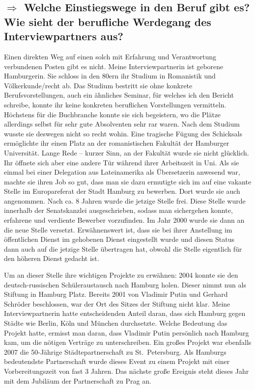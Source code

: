 \documentclass[12pt,headsepline,a4paper]{scrartcl}
\newcommand\quest[1]{\subsection*{$\Rightarrow$ #1}}
\begin{document}
\quest{Welche Einstiegswege in den Beruf gibt es? Wie sieht der berufliche Werdegang des Interviewpartners aus?}
Einen direkten Weg auf einen solch mit Erfahrung und Verantwortung verbundenen Posten gibt es nicht.
Meine Interviewpartnerin ist geborene Hamburgerin. Sie schloss in den 80ern ihr Studium in Romanistik und Völkerkunde/recht ab. Das Studium bestritt sie ohne konkrete Berufsvorstellungen, auch ein ähnliches Seminar, für welches ich den Bericht schreibe, konnte ihr keine konkreten beruflichen Vorstellungen vermitteln. Höchstens für die Buchbranche konnte sie sich begeistern, wo die Plätze allerdings selbst für sehr gute Absolventen sehr rar waren. Nach dem Studium wusste sie deswegen nicht so recht wohin. Eine tragische Fügung des Schicksals ermöglichte ihr einen Platz an der romanistischen Fakultät der Hamburger Universität. Lange Rede -- kurzer Sinn, an der Fakultät wurde sie nicht glücklich. Ihr öffnete sich aber eine andere Tür während ihrer Arbeitszeit in Uni.
Als sie einmal bei einer Delegation aus Lateinamerika als Übersetzerin anwesend war, machte sie ihren Job so gut, dass man sie dazu ermutigte sich im auf eine vakante Stelle im Europareferat der Stadt Hamburg zu bewerben. Dort wurde sie auch angenommen.
Nach ca. 8 Jahren wurde die jetzige Stelle frei. Diese Stelle wurde innerhalb der Senatskanzlei ausgeschrieben, sodass man sichergehen konnte, erfahrene und verdiente Bewerber vorzufinden.
Im Jahr 2000 wurde sie dann an die neue Stelle versetzt. Erwähnenswert ist, dass sie bei ihrer Anstellung im öffentlichen Dienst im gehobenen Dienst eingestellt wurde und diesen Status dann auch auf die jetzige Stelle übertragen hat, obwohl die Stelle eigentlich für den höheren Dienst gedacht ist.

Um an dieser Stelle ihre wichtigen Projekte zu erwähnen:
2004 konnte sie den deutsch-russischen Schüleraustausch nach Hamburg holen. Dieser nimmt nun als Stiftung in Hamburg Platz. Bereits 2001 von Vladimir Putin und Gerhard Schröder beschlossen, war der Ort des Sitzes der Stiftung nicht klar. Meine Interviewpartnerin hatte entscheidenden Anteil daran, dass sich Hamburg gegen Städte wie Berlin, Köln und München durchsetzte. Welche Bedeutung das Projekt hatte, ermisst man daran, dass Vladimir Putin persönlich nach Hamburg kam, um die nötigen Verträge zu unterschreiben.
Ein großes Projekt war ebenfalls 2007 die 50-Jährige Städtepartnerschaft zu  St.\ Petersburg. Als Hamburgs bedeutendste Partnerschaft wurde dieses Event zu einem Projekt mit einer Vorbereitungszeit von fast 3 Jahren.
Das nächste große Ereignis steht dieses Jahr mit dem Jubiläum der Partnerschaft zu Prag an.
\end{document}
